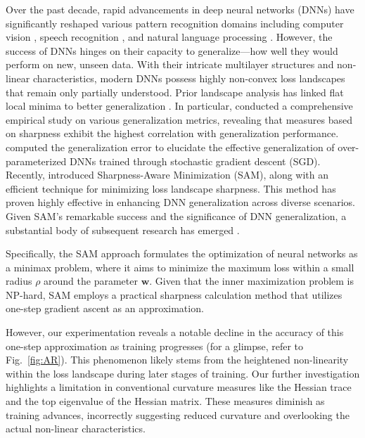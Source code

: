 \documentclass[letterpaper]{article} %
\theoremstyle{plain}
\theoremstyle{definition}
\newcommand{\fref}[1]{Fig.~\ref{#1}}
\begin{document}
Over the past decade, rapid advancements in deep neural networks (DNNs) have significantly reshaped various pattern recognition domains including computer vision \cite{he2016deep}, speech recognition \cite{oord2018parallel}, and natural language processing \cite{kenton2019bert}. However, the success of DNNs hinges on their capacity to generalize---how well they would perform on new, unseen data. With their intricate multilayer structures and non-linear characteristics, modern DNNs possess highly non-convex loss landscapes that remain only partially understood. Prior landscape analysis has linked flat local minima to better generalization \cite{hochreiter1997flat,keskar2016large,dziugaite2017computing,neyshabur2017exploring,Jiang2020Fantastic}. In particular, \cite{Jiang2020Fantastic} conducted a comprehensive empirical study on various generalization metrics, revealing that measures based on sharpness exhibit the highest correlation with generalization performance. \cite{dziugaite2017computing} computed the generalization error to elucidate the effective generalization of over-parameterized DNNs trained through stochastic gradient descent (SGD). Recently, \cite{foret2021sharpnessaware} introduced Sharpness-Aware Minimization (SAM), along with an efficient technique for minimizing loss landscape sharpness. This method has proven highly effective in enhancing DNN generalization across diverse scenarios. Given SAM's remarkable success and the significance of DNN generalization, a substantial body of subsequent research has emerged \cite{liu2022towards,du2022efficient,mi2022make,du2022sharpness,jiang2023an,liu2022random}.

Specifically, the SAM approach formulates the optimization of neural networks as a minimax problem, where it aims to minimize the maximum loss within a small radius $\rho$ around the parameter $\boldsymbol{w}$. Given that the inner maximization problem is NP-hard, SAM employs a practical sharpness calculation method that utilizes one-step gradient ascent as an approximation.

However, our experimentation reveals a notable decline in the accuracy of this one-step approximation as training progresses (for a glimpse, refer to \fref{fig:AR}). This phenomenon likely stems from the heightened non-linearity within the loss landscape during later stages of training. Our further investigation highlights a limitation in conventional curvature measures like the Hessian trace and the top eigenvalue of the Hessian matrix. These measures diminish as training advances, incorrectly suggesting reduced curvature and overlooking the actual non-linear characteristics.
\end{document}
